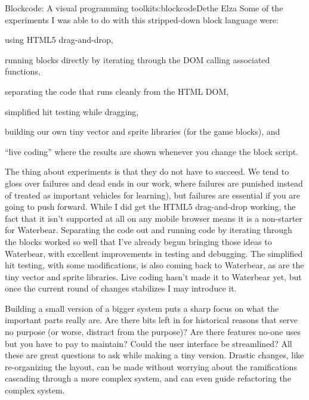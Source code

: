 \begin{aosachapter}{Blockcode: A visual programming toolkit}{s:blockcode}{Dethe Elza}
Some of the experiments I was able to do with this stripped-down block
language were:

\begin{aosaitemize}

\item
  using HTML5 drag-and-drop,
\item
  running blocks directly by iterating through the DOM calling
  associated functions,
\item
  separating the code that runs cleanly from the HTML DOM,
\item
  simplified hit testing while dragging,
\item
  building our own tiny vector and sprite libraries (for the game
  blocks), and
\item
  ``live coding'' where the results are shown whenever you change the
  block script.
\end{aosaitemize}

The thing about experiments is that they do not have to succeed. We tend
to gloss over failures and dead ends in our work, where failures are
punished instead of treated as important vehicles for learning), but
failures are essential if you are going to push forward. While I did get
the HTML5 drag-and-drop working, the fact that it isn't supported at all
on any mobile browser means it is a non-starter for Waterbear.
Separating the code out and running code by iterating through the blocks
worked so well that I've already begun bringing those ideas to
Waterbear, with excellent improvements in testing and debugging. The
simplified hit testing, with some modifications, is also coming back to
Waterbear, as are the tiny vector and sprite libraries. Live coding
hasn't made it to Waterbear yet, but once the current round of changes
stabilizes I may introduce it.

\label{what-are-we-trying-to-build-really}

Building a small version of a bigger system puts a sharp focus on what
the important parts really are. Are there bits left in for historical
reasons that serve no purpose (or worse, distract from the purpose)? Are
there features no-one uses but you have to pay to maintain? Could the
user interface be streamlined? All these are great questions to ask
while making a tiny version. Drastic changes, like re-organizing the
layout, can be made without worrying about the ramifications cascading
through a more complex system, and can even guide refactoring the
complex system.


\end{aosachapter}
